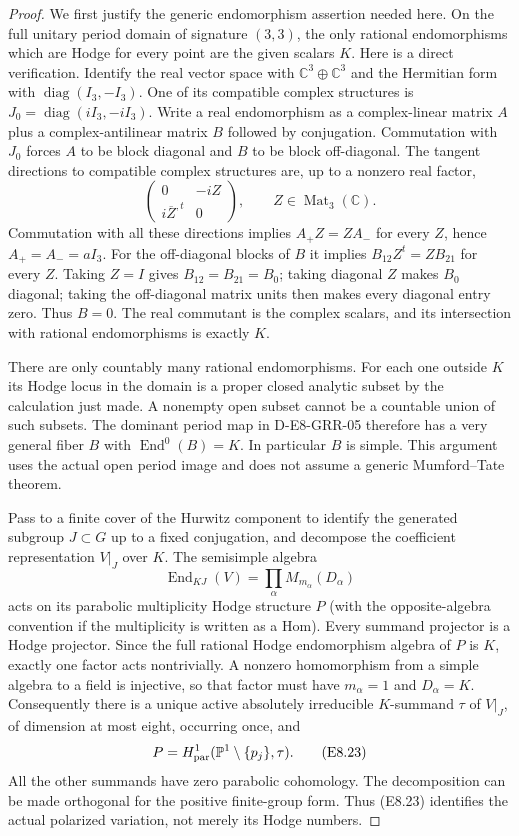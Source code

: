 \begin{proof}
We first justify the generic endomorphism assertion needed here.
On the full unitary period domain of signature $(3,3)$, the only
rational endomorphisms which are Hodge for every point are the
given scalars $K$.  Here is a direct verification.  Identify the
real vector space with $\mathbb C^3\oplus\mathbb C^3$ and the
Hermitian form with $\operatorname{diag}(I_3,-I_3)$.  One of its
compatible complex structures is
$J_0=\operatorname{diag}(iI_3,-iI_3)$.  Write a real endomorphism
as a complex-linear matrix $A$ plus a complex-antilinear matrix
$B$ followed by conjugation.  Commutation with $J_0$ forces
$A$ to be block diagonal and $B$ to be block off-diagonal.
The tangent directions to compatible complex structures are,
up to a nonzero real factor,
\[
       \begin{pmatrix}0&-iZ\\ i\overline Z^{,t}&0\end{pmatrix},
                   \qquad Z\in\operatorname{Mat}_3(\mathbb C).
\]
Commutation with all these directions implies
$A_+Z=ZA_-$ for every $Z$, hence $A_+=A_-=aI_3$.
For the off-diagonal blocks of $B$ it implies
$B_{12}Z^t=ZB_{21}$ for every $Z$.  Taking $Z=I$ gives
$B_{12}=B_{21}=B_0$; taking diagonal $Z$ makes $B_0$ diagonal;
taking the off-diagonal matrix units then makes every diagonal
entry zero.  Thus $B=0$.  The real commutant is the complex
scalars, and its intersection with rational endomorphisms is
exactly $K$.

There are only countably many rational endomorphisms.  For each
one outside $K$ its Hodge locus in the domain is a proper closed
analytic subset by the calculation just made.  A nonempty open
subset cannot be a countable union of such subsets.  The
dominant period map in D-E8-GRR-05 therefore has a very general
fiber $B$ with $\operatorname{End}^0(B)=K$.  In particular $B$
is simple.  This argument uses the actual open period image and
does not assume a generic Mumford--Tate theorem.

Pass to a finite cover of the Hurwitz component to identify the
generated subgroup $J\subset G$ up to a fixed conjugation, and
decompose the coefficient representation $V|_J$ over $K$.
The semisimple algebra
\[
 \operatorname{End}_{KJ}(V)=\prod_\alpha
                         M_{m_\alpha}(D_\alpha)
\]
acts on its parabolic multiplicity Hodge structure $P$ (with
the opposite-algebra convention if the multiplicity is written
as a Hom).  Every summand projector is a Hodge projector.
Since the full rational Hodge endomorphism algebra of $P$ is
$K$, exactly one factor acts nontrivially.  A nonzero
homomorphism from a simple algebra to a field is injective,
so that factor must have $m_\alpha=1$ and $D_\alpha=K$.
Consequently there is a unique active absolutely irreducible
$K$-summand $\tau$ of $V|_J$, of dimension at most eight,
occurring once, and
\[
       P=H^1_{\rm par}(\mathbb P^1\setminus\{p_j\},\tau).
                                                                  \tag{E8.23}
\]
All the other summands have zero parabolic cohomology.
The decomposition can be made orthogonal for the positive
finite-group form.  Thus (E8.23) identifies the actual polarized
variation, not merely its Hodge numbers.


\end{proof}
